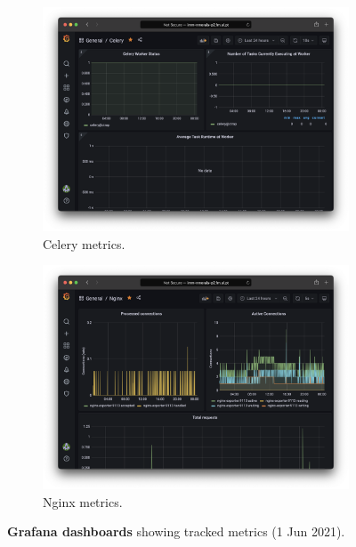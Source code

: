 \begin{figure}[!ht]
\begin{subfigure}[h]{0.45\textwidth}
		\includegraphics[width=\textwidth]{images/app-server/grafana-celery}
		\caption{Celery metrics.}
	\end{subfigure}
	\begin{subfigure}[h]{0.45\textwidth}
		\includegraphics[width=\textwidth]{images/app-server/grafana-nginx}
		\caption{Nginx metrics.}
	\end{subfigure}
	\caption[Grafana dashboards]{\textbf{Grafana dashboards} showing tracked metrics (1 Jun 2021).}
\label{fig:grafana}
\end{figure}

